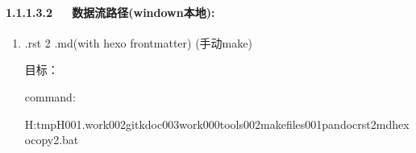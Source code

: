 \documentclass[letterpaper,12pt,english]{sphinxmanual}
\begin{document}
\paragraph{1.1.1.3.2   数据流路径(windown本地):}
\label{\detokenize{001software/001install/001._u7f51_u7ad9/gitpage:windown}}\begin{enumerate}
%
\item {} 
.rst 2 .md(with hexo frontmatter) (手动make)

目标：

\begin{sphinxVerbatim}[commandchars=\\\{\}]
\PYGZbs{}\PYGZbs{}\PYGZbs{}\PYGZbs{}\PYGZbs{}\PYGZbs{}\PYGZbs{}\PYGZbs{}\PYGZbs{}\PYGZbs{}\PYGZbs{}\PYGZbs{}
\PYGZbs{}\PYGZbs{}\PYGZbs{}\PYGZbs{}\PYGZbs{}\PYGZbs{}\PYGZbs{}\PYGZbs{}\PYGZbs{}\PYGZbs{}\PYGZbs{}\PYGZbs{}
\PYGZbs{}\PYGZbs{}\PYGZbs{}\PYGZbs{}\PYGZbs{}\PYGZbs{}\PYGZbs{}\PYGZbs{}\PYGZbs{}\PYGZbs{}\PYGZbs{}\PYGZbs{}\PYGZbs{}\PYGZbs{}\PYGZbs{}\PYGZbs{}\PYGZbs{}\PYGZbs{}
\PYGZbs{}\PYGZbs{}\PYGZbs{}\PYGZbs{}\PYGZbs{}\PYGZbs{}\PYGZbs{}\PYGZbs{}\PYGZbs{}\PYGZbs{}\PYGZbs{}\PYGZbs{}\PYGZbs{}\PYGZbs{}\PYGZbs{}\PYGZbs{}\PYGZbs{}\PYGZbs{}
\end{sphinxVerbatim}

command:

\begin{sphinxVerbatim}[commandchars=\\\{\}]
H:\PYGZbs{}\PYGZbs{}tmp\PYGZus{}H\PYGZbs{}\PYGZbs{}001.work\PYGZbs{}\PYGZbs{}002git\PYGZbs{}\PYGZbs{}kdoc\PYGZbs{}\PYGZbs{}003work\PYGZbs{}\PYGZbs{}000tools\PYGZbs{}\PYGZbs{}002makefiles\PYGZbs{}\PYGZbs{}001pandoc\PYGZbs{}\PYGZbs{}rst2md\PYGZus{}hexo\PYGZus{}copy2.bat


\end{sphinxVerbatim}
\end{enumerate}
\end{document}
